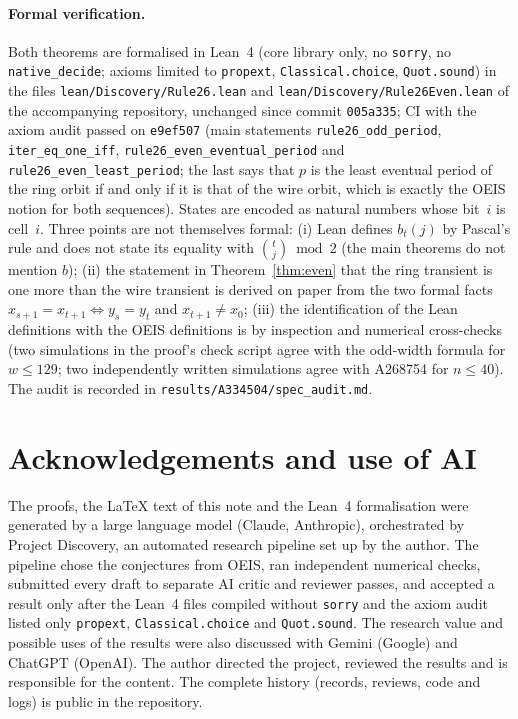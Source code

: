 \documentclass[11pt]{article}
\theoremstyle{definition}
\theoremstyle{remark}
\begin{document}
\paragraph{Formal verification.}
Both theorems are formalised in Lean~4 (core library only, no
\texttt{sorry}, no \texttt{native\_decide}; axioms limited to
\texttt{propext}, \texttt{Classical.choice}, \texttt{Quot.sound}) in the
files \texttt{lean/Discovery/Rule26.lean} and
\texttt{lean/Discovery/Rule26Even.lean} of the accompanying repository,
unchanged since commit \texttt{005a335}; CI with the axiom audit passed on
\texttt{e9ef507} (main statements \texttt{rule26\_odd\_period}, \texttt{iter\_eq\_one\_iff},
\texttt{rule26\_even\_eventual\_period} and
\texttt{rule26\_even\_least\_period}; the last says that $p$ is the least
eventual period of the ring orbit if and only if it is that of the wire orbit,
which is exactly the OEIS notion for both sequences).
States are encoded as natural numbers whose bit~$i$ is cell~$i$. Three points
are not themselves formal: (i) Lean defines $b_t(j)$ by
Pascal's rule and does not state its equality with $\binom{t}{j} \bmod 2$
(the main theorems do not mention $b$); (ii) the statement in
Theorem~\ref{thm:even} that the ring transient is one more than the wire
transient is derived on paper from the two formal facts
$x_{s+1} = x_{t+1} \iff y_s = y_t$ and $x_{t+1} \ne x_0$; (iii) the identification of the Lean
definitions with the OEIS definitions is by inspection and numerical
cross-checks (two simulations in the proof's check script agree with the
odd-width formula for $w \le 129$; two independently written simulations agree
with A268754 for $n \le 40$). The audit is recorded in
\texttt{results/A334504/spec\_audit.md}.

\section*{Acknowledgements and use of AI}
The proofs, the \LaTeX{} text of this note and the Lean~4 formalisation were
generated by a large language model (Claude, Anthropic), orchestrated by
Project Discovery, an automated research pipeline set up by the author. The
pipeline chose the conjectures from OEIS, ran independent numerical checks,
submitted every draft to separate AI critic and reviewer passes, and accepted
a result only after the Lean~4 files compiled without \texttt{sorry} and the
axiom audit listed only \texttt{propext}, \texttt{Classical.choice} and
\texttt{Quot.sound}. The research value and possible uses of the results were
also discussed with Gemini (Google) and ChatGPT (OpenAI). The author directed
the project, reviewed the results and is responsible for the content. The
complete history (records, reviews, code and logs) is public in the
repository.
\end{document}
